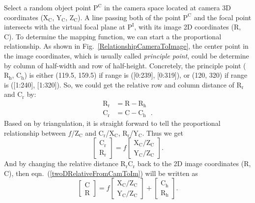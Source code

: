 Select a random object point \(\text{P}^\text{C}\) in the camera space located at camera 3D coordinates (\(\text{X}_\text{C}\), \(\text{Y}_\text{C}\), \(\text{Z}_\text{C}\)). A line passing both of the point \(\text{P}^\text{C}\) and the focal point intersects with the virtual focal plane at \(\text{P}^\text{I}\), with its image 2D coordinates (R, C). To determine the mapping function, we can start a the proportional relationship. As shown in Fig.~\ref{RelationshipCameraToImage}, the center point in the image coordinates, which is usually called \emph{principle point}, could be determine by column of half-width and row of half-height. Concretely, the principle point (\(\text{R}_\text{h}\), \(\text{C}_\text{h}\)) is either (119.5, 159.5) if range is ([0:239], [0:319]), or (120, 320) if range is ([1:240], [1:320]). So, we could get the relative row and column distance of  \(\text{R}_\text{r}\) and \(\text{C}_\text{r}\) by:
%
\begin{equation}
\begin{aligned}
\text{R}_\text{r} &= \text{R} - \text{R}_\text{h}%
\\%
\text{C}_\text{r} &= \text{C} - \text{C}_\text{h} \ \ \ .%
\end{aligned}
\label{relativeCRforProportional}
\end{equation}%
%
Based on by triangulation, it is straight forward to tell the proportional relationship between \(f\)/\(\text{Z}_\text{C}\) and \(\text{C}_\text{r}\)/\(\text{X}_\text{C}\), \(\text{R}_\text{r}\)/\(\text{Y}_\text{C}\). Thus we get
%
\begin{equation}
\left[ \begin{array}{c} \text{C}_\text{r} \\ \text{R}_\text{r} \end{array} \right] %
= f %
\left[ \begin{array}{c} \text{X}_\text{C}/\text{Z}_\text{C} \\ \text{Y}_\text{C}/\text{Z}_\text{C} \end{array} \right]  .%
\label{twoDRelativeFromCamToIm}
\end{equation}
\noindent
And by changing the relative distance \(\text{R}_\text{r}\text{C}_\text{r}\) back to the 2D image coordinates (R, C), then eqn.~(\ref{twoDRelativeFromCamToIm}) will be written as
%
\begin{equation}
\left[ \begin{array}{c} \text{C} \\ \text{R} \end{array} \right] %
= f %
\left[ \begin{array}{c} \text{X}_\text{C}/\text{Z}_\text{C} \\ \text{Y}_\text{C}/\text{Z}_\text{C} \end{array} \right]%
+
\left[ \begin{array}{c}  \text{C}_\text{h} \\  \text{R}_\text{h} \end{array} \right] .%
\label{linearRelationFromCamToIm}
\end{equation}
